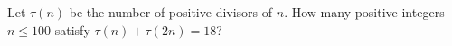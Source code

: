 Let $\tau(n)$ be the number of positive divisors of $n$. How many positive integers $n\le100$ satisfy $\tau(n)+\tau(2n)=18$?

